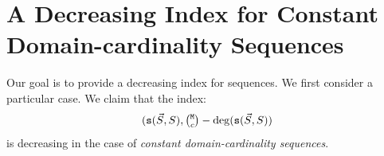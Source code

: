 \documentclass{lmcs}
\newtheorem{lemma}[theorem]{Lemma}
\begin{document}
%
%
%
%
%
%
%


\section{A Decreasing Index for Constant Domain-cardinality Sequences}
Our goal is to provide a decreasing index for sequences. We first consider a particular case.
We claim that the index:
$$
(\size(\vec{S},S), \newton{\MaxInd}{c} - \deg(\size(\vec{S},S))
$$
is decreasing in the case of \emph{constant domain-cardinality sequences}.
\end{document}
